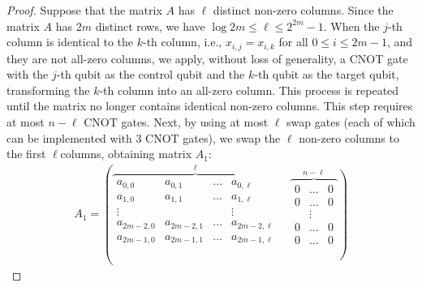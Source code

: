\documentclass[a4paper,UKenglish,cleveref, autoref, thm-restate]{lipics-v2021}
\begin{document}
\begin{proof}
Suppose that the matrix $A$ has $\ell$ distinct non-zero columns. Since the matrix $A$ has $2m$ distinct rows, we have $\log 2m \leq \ell \leq 2^{2m}-1$. When the $j$-th column is identical to the $k$-th column, i.e., $x_{i, j} = x_{i, k}$ for all $0 \leq i \leq 2m-1$, and they are not all-zero columns, we apply, without loss of generality, a CNOT gate with the $j$-th qubit as the control qubit and the $k$-th qubit as the target qubit, transforming the $k$-th column into an all-zero column. This process is repeated until the matrix no longer contains identical non-zero columns.  This step requires at most $n-\ell$ CNOT gates.
Next, by using at most $\ell$ swap gates (each of which can be implemented with $3$ CNOT gates), we swap the $\ell$ non-zero columns to the first $\ell$columns, obtaining matrix $A_1$:
\begin{align}
    A_1 = \left( \overbrace{\begin{matrix}
        a_{0, 0} & a_{0, 1} & \dots & a_{0, \ell}    \\
        a_{1, 0} & a_{1, 1} & \dots & a_{1, \ell}   \\
        \vdots & & & \vdots  \\
        a_{2m-2, 0} & a_{2m-2, 1} & \dots & a_{2m-2, \ell}   \\
        a_{2m-1, 0} & a_{2m-1, 1} & \dots & a_{2m-1, \ell}   \\
    \end{matrix}}^{\ell} \right. \quad
    \left. \overbrace{\begin{matrix}
           0 & \dots & 0 \\
           0 & \dots & 0 \\
           & \vdots& \\
           0 & \dots & 0 \\
           0 & \dots & 0 
    \end{matrix}}^{n - \ell} \right)
\end{align}


\end{proof}
\end{document}
